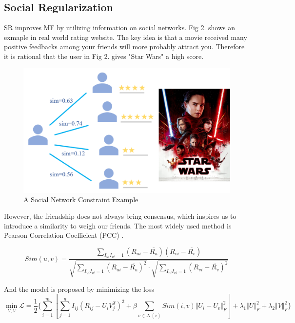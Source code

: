 \documentclass{article}
\begin{document}
\subsection{Social Regularization}
SR improves MF by utilizing information on social networks. Fig 2. shows an exmaple in real world rating website. The key idea is that a movie 
received many positive feedbacks among your friends will more probably attract you. 
Therefore it is rational that the user in Fig 2. gives "Star Wars" a high score. 

\begin{figure}[h]
  \centering
  \includegraphics[scale=0.35]{pic/figure2.png}
  \caption{A Social Network Constraint Example}
\end{figure}

However, the friendship does not always bring consensus, which inspires us to introduce 
a similarity to weigh our friends. The most widely used method is 
Pearson Correlation Coefficient (PCC) \cite{bre1998pcc}.

\begin{equation}
  {Sim}(u, v) = \frac{\sum_{I_{ui} I_{vi} = 1} (R_{ui} - \overline{R_u}) (R_{vi} - \overline{R_v}) }
  {\sqrt{\sum_{I_{ui} I_{vi} = 1} (R_{ui} - \overline{R_u})^2} \cdot \sqrt{\sum_{I_{ui} I_{vi} = 1} (R_{vi} - \overline{R_v})^2}}
\end{equation}

And the model is proposed by minimizing the loss
\begin{equation}
  \min_{U, V} \mathcal{L} = \frac{1}{2} \{\sum_{i=1}^m [\sum_{j=1}^n I_{ij} (R_{ij} - U_iV_j^T)^2 + \beta \sum_{v \in \mathcal{N}(i)} {Sim}(i, v) \Vert U_i - U_v \Vert_F^2 ] + \lambda_1 \Vert U \Vert_F^2 + \lambda_2 \Vert V \Vert_F^2 \}
\end{equation}
\end{document}

